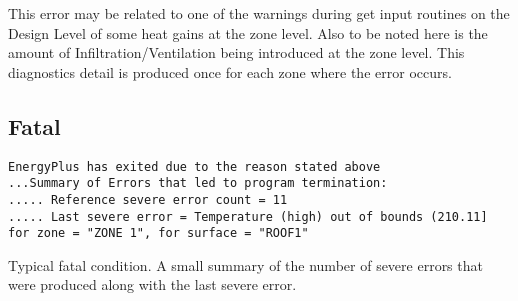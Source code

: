 This error may be related to one of the warnings during get input routines on the Design Level of some heat gains at the zone level. Also to be noted here is the amount of Infiltration/Ventilation being introduced at the zone level. This diagnostics detail is produced once for each zone where the error occurs.

\subsection{Fatal}\label{fatal}

\begin{lstlisting}
EnergyPlus has exited due to the reason stated above
...Summary of Errors that led to program termination:
..... Reference severe error count = 11
..... Last severe error = Temperature (high) out of bounds (210.11] for zone = "ZONE 1", for surface = "ROOF1"
\end{lstlisting}

Typical fatal condition. A small summary of the number of severe errors that were produced along with the last severe error.
